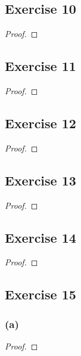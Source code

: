 \documentclass[14pt]{extarticle}
\begin{document}
\subsection{Exercise 10}

\begin{proof}

\end{proof}

\subsection{Exercise 11}

\begin{proof}

\end{proof}

\subsection{Exercise 12}

\begin{proof}

\end{proof}

\subsection{Exercise 13}

\begin{proof}

\end{proof}

\subsection{Exercise 14}

\begin{proof}

\end{proof}

\subsection{Exercise 15}

\subsubsection{(a)}

\begin{proof}

\end{proof}
\end{document}
